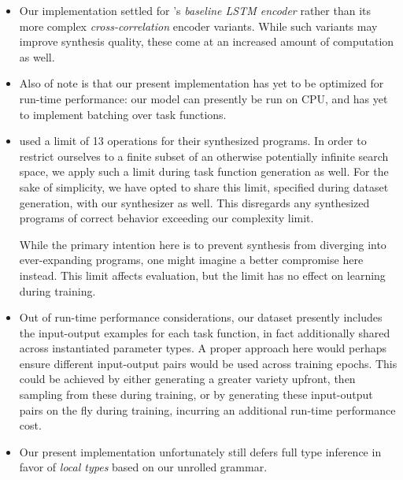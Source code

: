 \documentclass{article}
\begin{document}
\begin{itemize}
    \item
    Our implementation settled for \citet{nsps}'s \emph{baseline LSTM encoder} rather than its more complex \emph{cross-correlation} encoder variants.
    While such variants may improve synthesis quality,
    these come at an increased amount of computation as well.

    \item
    Also of note is that our present implementation has yet to be optimized for run-time performance:
    our model can presently be run on CPU,
    and has yet to implement batching over task functions.

    \item
    \citet{nsps} used a limit of 13 operations for their synthesized programs.
    In order to restrict ourselves to a finite subset of an otherwise potentially infinite search space,
    we apply such a limit during task function generation as well.
    For the sake of simplicity, we have opted to share this limit,
    specified during dataset generation, with our synthesizer as well.
    This disregards any synthesized programs of
    correct behavior exceeding our complexity limit.

    While the primary intention here is to prevent synthesis
    from diverging into ever-expanding programs,
    one might imagine a better compromise here instead.
    This limit affects evaluation,
    but the limit has no effect on learning during training.

    \item
    Out of run-time performance considerations,
    our dataset presently includes the input-output examples for each task function,
    in fact additionally shared across instantiated parameter types.
    A proper approach here would perhaps ensure different input-output pairs would be used across training epochs.
    This could be achieved by either generating a greater variety upfront,
    then sampling from these during training, or by generating these input-output pairs on the fly during training,
    incurring an additional run-time performance cost.

    \item
    Our present implementation unfortunately still defers full type inference in favor of \emph{local types} based on our unrolled grammar.


\end{itemize}
\end{document}

